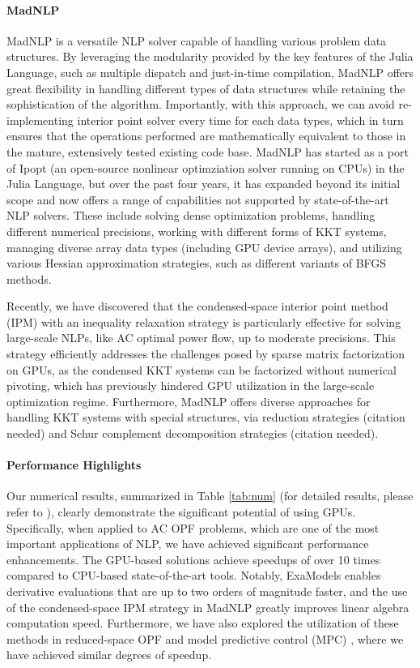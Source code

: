 \paragraph{MadNLP}

MadNLP is a versatile NLP solver capable of
handling various problem data structures. By leveraging the modularity
provided by the key features of the Julia Language, such as multiple
dispatch and just-in-time compilation, MadNLP offers great flexibility
in handling different types of data structures while retaining the
sophistication of the algorithm. Importantly, with this approach, we can avoid
re-implementing interior point solver every time for each data types,
which in turn ensures that the operations performed are mathematically
equivalent to those in the mature, extensively tested existing code
base. MadNLP has started as a port of Ipopt (an open-source nonlinear
optimziation solver running on CPUs) in the Julia Language, but over
the past four years, it has expanded beyond its initial scope and now
offers a range of capabilities not supported by state-of-the-art NLP
solvers. These include solving dense optimization problems, handling
different numerical precisions, working with different forms of KKT
systems, managing diverse array data types (including GPU device
arrays), and utilizing various Hessian approximation strategies, such
as different variants of BFGS methods.

Recently, we have discovered that the condensed-space interior point
method (IPM) with an inequality relaxation strategy is particularly
effective for solving large-scale NLPs, like AC optimal power flow, up
to moderate precisions. This strategy efficiently addresses the
challenges posed by sparse matrix factorization on GPUs, as the
condensed KKT systems can be factorized without numerical pivoting,
which has previously hindered GPU utilization in the large-scale
optimization regime.  Furthermore, MadNLP offers diverse approaches
for handling KKT systems with special structures, via reduction
strategies (citation needed) and Schur complement decomposition
strategies (citation needed).



\paragraph{Performance Highlights}

Our numerical results, summarized in Table \ref{tab:num} (for detailed
results, please refer to \cite{shin2023accelerating}), clearly
demonstrate the significant potential of using GPUs. Specifically,
when applied to AC OPF problems, which are one of the most important
applications of NLP, we have achieved significant performance
enhancements. The GPU-based solutions achieve speedups of over 10
times compared to CPU-based state-of-the-art tools. Notably, ExaModels
enables derivative evaluations that are up to two orders of magnitude
faster, and the use of the condensed-space IPM strategy in MadNLP
greatly improves linear algebra computation speed. Furthermore, we
have also explored the utilization of these methods in reduced-space
OPF \cite{} and model predictive control (MPC) \cite{}, where we have
achieved similar degrees of speedup.


